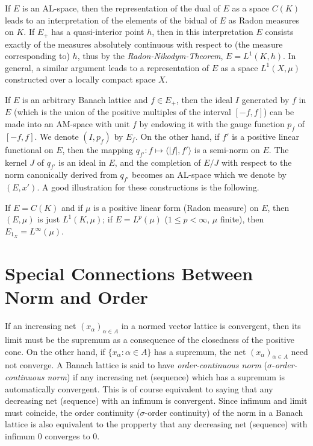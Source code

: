 If $ E $ is an AL-space, then the representation of the dual of $ E $ as a space $ C(K) $ leads to an interpretation of the elements of the bidual of $ E $ as Radon measures on $ K $.
If $ E_{+} $ has a quasi-interior point $ h $, then in this interpretation $ E $ consists exactly of the measures absolutely continuous with respect to (the measure corresponding to) $ h $, thus by the \emph{Radon-Nikodym-Theorem}, $ E = L^{1}(K,h) $.
In general, a similar argument leads to a representation of $ E $ as a space $ L^{1}(X,\mu) $ constructed over a locally compact space $ X $.

If $ E $ is an arbitrary Banach lattice and $ f \in E_{+} $, then the ideal $ I $ generated by $ f $ in $ E $ (which is the union of the positive multiples of the interval $ [-f,f] $) can be made into an AM-space with unit $ f $ by endowing it with the gauge function $ p_{f} $ of $ [-f,f] $.
We denote $ (I,p_{f}) $ by $ E_{f} $.
On the other hand, if $ f' $ is a positive linear functional on $ E $, then the mapping $ q_{f'} \colon f \mapsto \langle |f|,f'\rangle $ is a semi-norm on $ E $.
The kernel $ J $ of $ q_{f'} $ is an ideal in $ E $, and the completion of $ E/J $ with respect to the norm canonically derived from $ q_{f'} $ becomes an AL-space which we denote by $ (E,x') $.
A good illustration for these constructions is the following.

If $ E = C(K) $ and if $ \mu $ is a positive linear form (Radon measure) on $ E $, then $ (E,\mu) $ is just $ L^{1}(K,\mu) $;
if $ E = L^{p}(\mu) $ ($ 1 \leq p < \infty $, $ \mu $ finite), then $ E_{1_{X}} = L^{\infty}(\mu) $.
\section{Special Connections Between Norm and Order}\label{sec:c1-5}

If an increasing net $ (x_{\alpha})_{\alpha\in A} $ in a normed vector lattice is convergent, then its limit must be the supremum as a consequence of the closedness of the positive cone.
On the other hand, if $ \{x_{\alpha} \colon \alpha \in A\} $ has a supremum, the net $ (x_{\alpha})_{\alpha\in A} $ need not converge.
A Banach lattice is said to have \emph{order-continuous norm} ($ \sigma $-\emph{order-continuous norm}) if any increasing net (sequence) which has a supremum is automatically convergent.
This is of course equivalent to saying that any decreasing net (sequence) with an infimum is convergent.
Since infimum and limit must coincide, the order continuity ($ \sigma $-order continuity) of the norm in a Banach lattice is also equivalent to the propperty that any decreasing net (sequence) with infimum $ 0 $ converges to $ 0 $.

